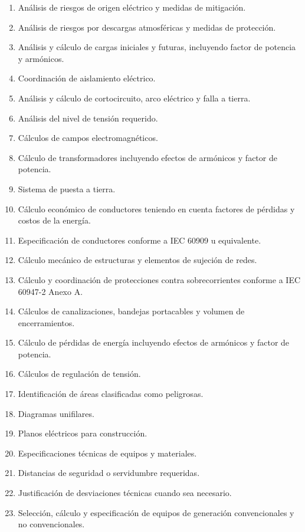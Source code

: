 \begin{enumerate}[label=\alph*), leftmargin=1.8cm, itemsep=3pt]
    \item Análisis de riesgos de origen eléctrico y medidas de mitigación.
    \item Análisis de riesgos por descargas atmosféricas y medidas de protección.
    \item Análisis y cálculo de cargas iniciales y futuras, incluyendo factor de potencia y armónicos.
    \item Coordinación de aislamiento eléctrico.
    \item Análisis y cálculo de cortocircuito, arco eléctrico y falla a tierra.
    \item Análisis del nivel de tensión requerido.
    \item Cálculos de campos electromagnéticos.
    \item Cálculo de transformadores incluyendo efectos de armónicos y factor de potencia.
    \item Sistema de puesta a tierra.
    \item Cálculo económico de conductores teniendo en cuenta factores de pérdidas y costos de la energía.
    \item Especificación de conductores conforme a IEC 60909 u equivalente.
    \item Cálculo mecánico de estructuras y elementos de sujeción de redes.
    \item Cálculo y coordinación de protecciones contra sobrecorrientes conforme a IEC 60947-2 Anexo A.
    \item Cálculos de canalizaciones, bandejas portacables y volumen de encerramientos.
    \item Cálculo de pérdidas de energía incluyendo efectos de armónicos y factor de potencia.
    \item Cálculos de regulación de tensión.
    \item Identificación de áreas clasificadas como peligrosas.
    \item Diagramas unifilares.
    \item Planos eléctricos para construcción.
    \item Especificaciones técnicas de equipos y materiales.
    \item Distancias de seguridad o servidumbre requeridas.
    \item Justificación de desviaciones técnicas cuando sea necesario.
    \item Selección, cálculo y especificación de equipos de generación convencionales y no convencionales.
\end{enumerate}



